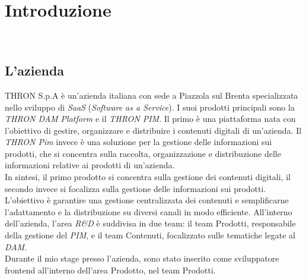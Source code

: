\chapter{Introduzione}\label{cap:introduzione}

\\

\section{L'azienda}
THRON S.p.A è un'azienda italiana con sede a Piazzola sul Brenta specializzata nello sviluppo di \textit{SaaS} (\textit{Software as a Service}).
I suoi prodotti principali sono la \textit{THRON DAM Platform} e il \textit{THRON PIM}. 
Il primo è una piattaforma nata con l'obiettivo di gestire, organizzare e distribuire i contenuti digitali di un'azienda.
Il \textit{THRON Pim} invece è una soluzione per la gestione delle informazioni sui prodotti, che si concentra
sulla raccolta, organizzazione e distribuzione delle informazioni relative ai prodotti di un'azienda.\\
In sintesi, il primo prodotto si concentra sulla gestione dei contenuti digitali, il secondo invece
si focalizza sulla gestione delle informazioni sui prodotti.
L'obiettivo è garantire una gestione centralizzata dei contenuti e semplificarne l'adattamento e la distribuzione su diversi
canali in modo efficiente.
All'interno dell'azienda, l'area \textit{R\&D} è suddivisa in due team: il team Prodotti, responsabile della gestione
del \textit{PIM}, e il team Contenuti, focalizzato sulle tematiche legate al \textit{DAM}.\\
Durante il mio stage presso l'azienda, sono stato inserito come sviluppatore frontend all'interno dell'area Prodotto, nel team Prodotti.


